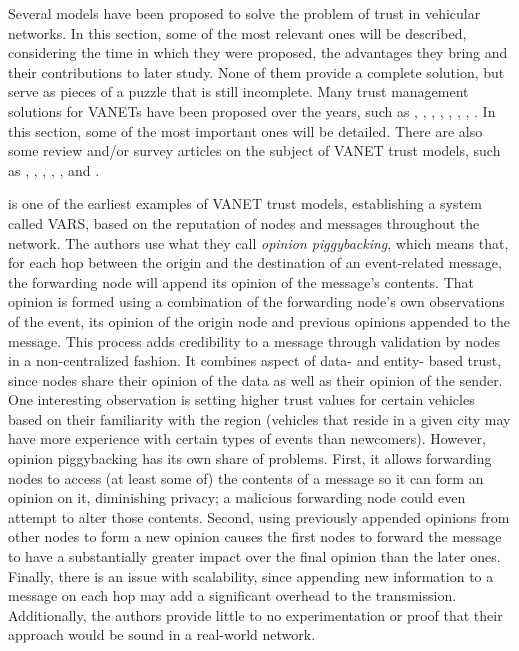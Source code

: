 Several models have been proposed to solve the problem of trust in vehicular networks. 
In this section, some of the most relevant ones will be described, considering the time in which they were proposed, the advantages they bring and their contributions to later study. 
None of them provide a complete solution, but serve as pieces of a puzzle that is still incomplete. 
Many trust management solutions for VANETs have been proposed over the years, such as \cite{patwardhan2006data}, \cite{gerlach2007trust}, \cite{raya2008data}, \cite{huang2010situation}, \cite{ding2013novel}, \cite{haddadou2013trust}, \cite{liu2016lsot}, \cite{kerrache2016detection}.
In this section, some of the most important ones will be detailed.
There are also some review and/or survey articles on the subject of VANET trust models, such as \cite{zhang2011survey}, \cite{ma2011survey}, \cite{zhang2012trust}, \cite{mejri2014survey}, \cite{soleymani2015trust} \cite{sengar2016survey}, and \cite{dwivedi2016review}. 

\cite{dotzer2005vars} is one of the earliest examples of VANET trust models, establishing a system called VARS, based on the reputation of nodes and messages throughout the network.
The authors use what they call \textit{opinion piggybacking}, which means that, for each hop between the origin and the destination of an event-related message, the forwarding node will append its opinion of the message's contents.
That opinion is formed using a combination of the forwarding node's own observations of the event, its opinion of the origin node and previous opinions appended to the message.
This process adds credibility to a message through validation by nodes in a non-centralized fashion.
It combines aspect of data- and entity- based trust, since nodes share their opinion of the data as well as their opinion of the sender. 
One interesting observation is setting higher trust values for certain vehicles based on their familiarity with the region (vehicles that reside in a given city may have more experience with certain types of events than newcomers).
However, opinion piggybacking has its own share of problems.
First, it allows forwarding nodes to access (at least some of) the contents of a message so it can form an opinion on it, diminishing privacy; a malicious forwarding node could even attempt to alter those contents.
Second, using previously appended opinions from other nodes to form a new opinion causes the first nodes to forward the message to have a substantially greater impact over the final opinion than the later ones.
Finally, there is an issue with scalability, since appending new information to a message on each hop may add a significant overhead to the transmission. Additionally, the authors provide little to no experimentation or proof that their approach would be sound in a real-world network.

